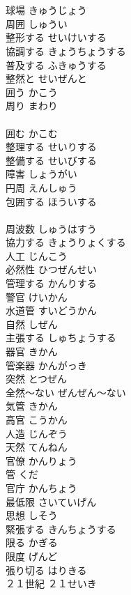 \documentclass[8pt]{extreport}
\begin{document}
\begin{CJK}{UTF8}{min}
\\	[漢語]
\\	球場	きゅうじょう	
\\	周囲	しゅうい	
\\	整形する	せいけいする	
\\	協調する	きょうちょうする	
\\	普及する	ふきゅうする	
\\	整然と	せいぜんと	
\\	囲う	かこう	
\\	周り	まわり	
\\	[和語]
\\	囲む	かこむ	
\\	整理する	せいりする	
\\	整備する	せいびする	
\\	障害	しょうがい	
\\	円周	えんしゅう	
\\	包囲する	ほういする	
\\	[漢語]
\\	周波数	しゅうはすう	
\\	協力する	きょうりょくする	
\\	人工	じんこう	
\\	必然性	ひつぜんせい	
\\	管理する	かんりする	
\\	警官	けいかん	
\\	水道管	すいどうかん	
\\	自然	しぜん	
\\	主張する	しゅちょうする	
\\	器官	きかん	
\\	管楽器	かんがっき	
\\	突然	とつぜん	
\\	全然～ない	ぜんぜん～ない	
\\	気管	きかん	
\\	高官	こうかん	
\\	人造	じんぞう	
\\	天然	てんねん	
\\	官僚	かんりょう	
\\	管	くだ	
\\	官庁	かんちょう	
\\	最低限	さいていげん	
\\	思想	しそう	
\\	緊張する	きんちょうする	
\\	限る	かぎる	
\\	限度	げんど	
\\	張り切る	はりきる	
\\	２１世紀	２１せいき	

\end{CJK}
\end{document}
